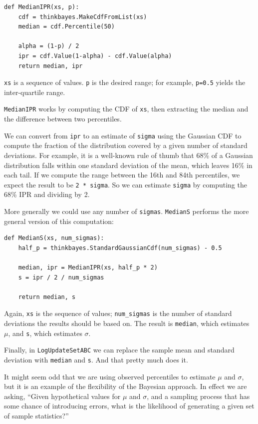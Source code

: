 \documentclass[12pt]{book}
\begin{document}
\begin{verbatim}
def MedianIPR(xs, p):
    cdf = thinkbayes.MakeCdfFromList(xs)
    median = cdf.Percentile(50)

    alpha = (1-p) / 2
    ipr = cdf.Value(1-alpha) - cdf.Value(alpha)
    return median, ipr
\end{verbatim}

{\tt xs} is a sequence of values.  {\tt p} is the desired range;
for example, {\tt p=0.5} yields the inter-quartile range.

{\tt MedianIPR} works by computing the CDF of {\tt xs},
then extracting the median and the difference between two
percentiles.

We can convert from {\tt ipr} to an estimate of {\tt sigma} using the
Gaussian CDF to compute the fraction of the distribution covered by a
given number of standard deviations.  For example, it is a well-known
rule of thumb that 68\% of a Gaussian distribution falls within one
standard deviation of the mean, which leaves 16\% in each tail.  If we
compute the range between the 16th and 84th percentiles, we expect the
result to be {\tt 2 * sigma}.  So we can estimate {\tt sigma} by
computing the 68\% IPR and dividing by 2.

More generally we could use any number of {\tt sigmas}.
{\tt MedianS} performs the more general version of this
computation:

\begin{verbatim}
def MedianS(xs, num_sigmas):
    half_p = thinkbayes.StandardGaussianCdf(num_sigmas) - 0.5

    median, ipr = MedianIPR(xs, half_p * 2)
    s = ipr / 2 / num_sigmas

    return median, s
\end{verbatim}

Again, {\tt xs} is the sequence of values; \verb"num_sigmas" is the
number of standard deviations the results should be based on.  The
result is {\tt median}, which estimates $\mu$, and {\tt s}, which 
estimates $\sigma$.

Finally, in {\tt LogUpdateSetABC} we can replace the sample mean and
standard deviation with {\tt median} and {\tt s}.  And that pretty
much does it.

It might seem odd that we are using observed percentiles to
estimate $\mu$ and $\sigma$, but it is an example of the
flexibility of the Bayesian approach.  In effect we are asking,
``Given hypothetical values for $\mu$ and $\sigma$, and
a sampling process that has some chance of introducing errors,
what is the likelihood of generating a given set of sample
statistics?''
\end{document}
